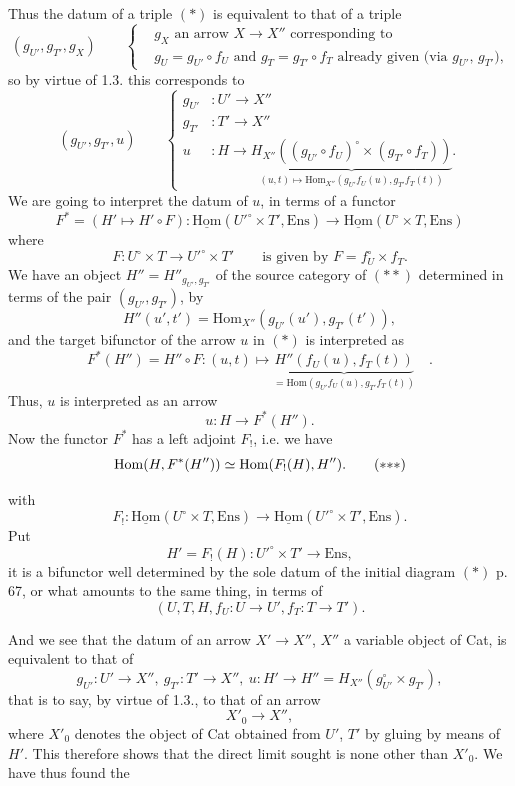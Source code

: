 \documentclass[11pt]{article}
\newcommand{\printedpage}[1]{\marginpar{\footnotesize p.~#1}}
\newcommand{\msp}[1]{\marginpar{\footnotesize [#1]}}
\newcommand{\Hom}{\mathrm{Hom}}
\newcommand{\uHom}{\underline{\mathrm{Hom}}}
\newcommand{\Ens}{\mathrm{Ens}}
\begin{document}
\msp{page 68} Thus the datum of a triple $(*)$ is equivalent to that of a triple
\[
(g_{U'}, g_{T'}, g_X) \qquad
\left\{\begin{aligned}
&g_X \text{ an arrow } X\longrightarrow X'' \text{ corresponding to}\\
&g_U = g_{U'}\circ f_U \text{ and } g_T = g_{T'}\circ f_T \text{ already given (via } g_{U'}\text{, } g_{T'}\text{),}
\end{aligned}\right.
\]
so by virtue of 1.3. this corresponds to
\[
(g_{U'}, g_{T'}, u) \qquad
\left\{\begin{aligned}
g_{U'} &: U' \longrightarrow X''\\
g_{T'} &: T' \longrightarrow X''\\
u &: H \longrightarrow \underbrace{H_{X''}\left((g_{U'}\circ f_U)^{\circ}\times(g_{T'}\circ f_T)\right)}_{(u,t)\longmapsto \Hom_{X''}(g_{U'}f_U(u),g_{T'}f_T(t))}.
\end{aligned}\right.
\tag*{$(*)$}
\]
We are going to interpret the datum of $u$, in terms of a functor
\[
F^{*} = (H'\longmapsto H'\circ F) : \uHom(U'^{\circ}\times T',\Ens) \longrightarrow \uHom(U^{\circ}\times T,\Ens)
\tag*{$(**)$}
\]
where
\[
F : U^{\circ}\times T \longrightarrow U'^{\circ}\times T' \qquad \text{is given by } F = f_U^{\circ}\times f_T.
\]
We have an object $H''=H''_{g_{U'},g_{T'}}$ of the source category of $(**)$ determined in terms of the pair $(g_{U'},g_{T'})$, by
\[
H''(u',t') = \Hom_{X''}(g_{U'}(u'),g_{T'}(t')),
\]
and the target bifunctor of the arrow $u$ in $(*)$ is interpreted as
\[
F^{*}(H'') = H''\circ F : (u,t)\longmapsto \underbrace{H''(f_U(u),f_T(t))}_{=\Hom(g_{U'}f_U(u),g_{T'}f_T(t))} \quad .
\]
Thus, $u$ is interpreted as an arrow
\[
u : H \longrightarrow F^{*}(H'').
\]
Now the functor $F^{*}$ has a left adjoint $F_{!}$, i.e. we have
\[
\Hom(H,F^{*}(H'')) \simeq \Hom(F_{!}(H),H'').
\tag*{$(*{*}*)$}
\]

\printedpage{50}
\msp{page 69} with
\[
F_{!} : \uHom(U^{\circ}\times T,\Ens) \longrightarrow \uHom(U'^{\circ}\times T',\Ens).
\]
Put
\[
H' = F_{!}(H) : U'^{\circ}\times T' \longrightarrow \Ens,
\]
it is a bifunctor well determined by the sole datum of the initial diagram $(*)$ p. 67, or what amounts to the same thing, in terms of %
\[
(U,T,H,f_U : U\longrightarrow U', f_T : T\longrightarrow T').
\]

And we see that the datum of an arrow $X'\longrightarrow X''$, $X''$ a variable object of Cat, is equivalent to that of
\[
g_{U'} : U'\longrightarrow X'',\ g_{T'} : T'\longrightarrow X'',\ u : H'\longrightarrow H'' = H_{X''}(g_{U'}^{\circ}\times g_{T'}),
\]
that is to say, by virtue of 1.3., to that of an arrow
\[
X'_0 \longrightarrow X'',
\]
where $X'_0$ denotes the object of Cat obtained from $U'$, $T'$ by gluing by means of $H'$. This therefore shows that the direct limit sought is none other than $X'_0$. We have thus found the
\end{document}
